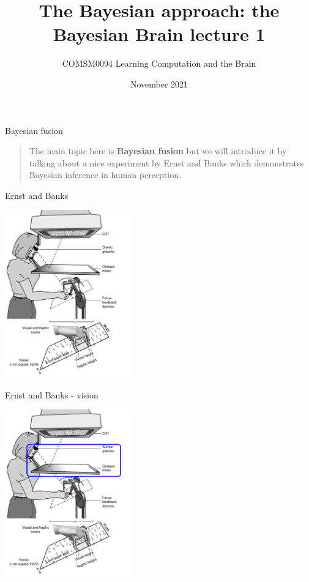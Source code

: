 \documentclass{beamer}
\title[The Bayesian Brain lecture 1]{The Bayesian approach: the Bayesian Brain lecture 1}
\author{COMSM0094 Learning Computation and the Brain}
\institute{\texttt{comsm0094.github.io}}
\date{November 2021}
\begin{document}
\maketitle



\begin{frame}{Bayesian fusion}
  \begin{quote}
    The main topic here is \textbf{Bayesian fusion} but we will introduce it by talking about a nice experiment by Ernst and Banks which demonstrates Bayesian inference in human perception.
  \end{quote}
  \vfill
\end{frame}

\begin{frame}{Ernst and Banks}
\begin{center}
\includegraphics[width=5.5cm]{fig_ernstbanks.png}
\end{center}
  \vfill
\end{frame}


\begin{frame}{Ernst and Banks - vision}
\begin{center}
\includegraphics[width=5.5cm]{fig_ernstbanks_vision.png}
\end{center}
  \vfill
\end{frame}
\end{document}
